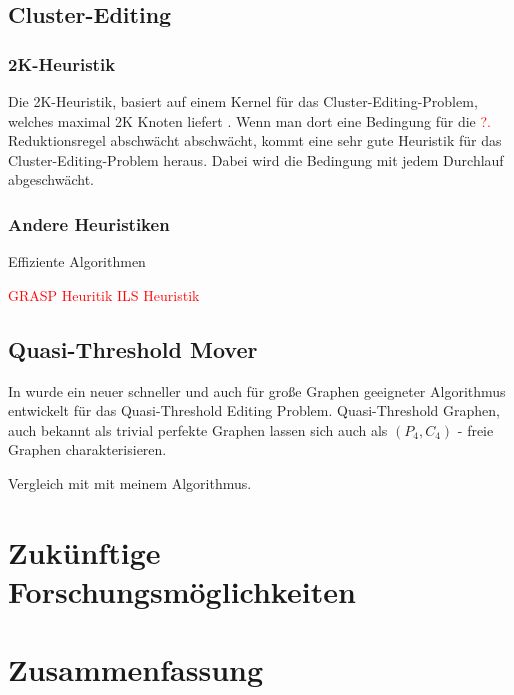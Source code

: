 \documentclass[12pt,a4paper,onecolumn,oneside,titlepage]{article}
\let\oldReturn\Return
\renewcommand{\Return}{\State\oldReturn}
\newcommand\todo[1]{\textcolor{red}{#1}}
\begin{document}
\subsection{Cluster-Editing}
\subsubsection{2K-Heuristik}
Die 2K-Heuristik, basiert auf einem Kernel für das Cluster-Editing-Problem, welches maximal 2K Knoten liefert \cite{Chen12}. Wenn man dort eine Bedingung für die \todo{?.} Reduktionsregel abschwächt  abschwächt, kommt eine sehr gute Heuristik für das Cluster-Editing-Problem heraus. Dabei wird die Bedingung mit jedem Durchlauf abgeschwächt.
\pagebreak
\begin{center}
  \label{euclid}
\begin{algorithmic}[1]
			\EndFor
		\EndIf
	\EndFor
\EndWhile

\EndFunction

	\EndFor

\EndFunction
{}
	\EndFor

\EndFunction
\end{algorithmic}
\end{center}


\subsubsection{Andere Heuristiken}
\cite{Bastos2014} Effiziente Algorithmen

 \todo{GRASP Heuritik}
 \todo{ILS Heuristik}

\subsection{Quasi-Threshold Mover}
In \cite{BrandesHSW15} wurde ein neuer schneller und auch für große Graphen geeigneter Algorithmus entwickelt für das Quasi-Threshold Editing Problem. Quasi-Threshold Graphen, auch bekannt als trivial perfekte Graphen lassen sich auch als $(P_4, C_4)$ - freie Graphen charakterisieren. 


Vergleich mit mit meinem Algorithmus.


\section{Zukünftige Forschungsmöglichkeiten}
\section{Zusammenfassung}




\end{document}
